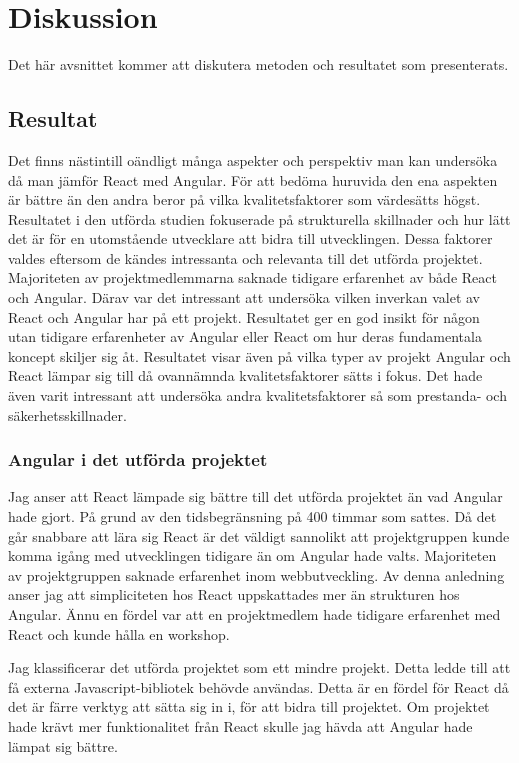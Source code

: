 \section{Diskussion}
\label{sec:axel-discussion}
Det här avsnittet kommer att diskutera metoden och resultatet som presenterats. 

\subsection{Resultat}
\label{subsec:axel-discussion-results}
Det finns nästintill oändligt många aspekter och perspektiv man kan undersöka då man jämför React med Angular. För att bedöma huruvida den ena aspekten är bättre än den andra beror på vilka kvalitetsfaktorer som värdesätts högst. Resultatet i den utförda studien fokuserade på strukturella skillnader och hur lätt det är för en utomstående utvecklare att bidra till utvecklingen. Dessa faktorer valdes eftersom de kändes intressanta och relevanta till det utförda projektet. Majoriteten av projektmedlemmarna saknade tidigare erfarenhet av både React och Angular. Därav var det intressant att undersöka vilken inverkan valet av React och Angular har på ett projekt. Resultatet ger en god insikt för någon utan tidigare erfarenheter av Angular eller React om hur deras fundamentala koncept skiljer sig åt. Resultatet visar även på vilka typer av projekt Angular och React lämpar sig till då ovannämnda kvalitetsfaktorer sätts i fokus. Det hade även varit intressant att undersöka andra kvalitetsfaktorer så som prestanda- och säkerhetsskillnader.

\subsubsection{Angular i det utförda projektet}
Jag anser att React lämpade sig bättre till det utförda projektet än vad Angular hade gjort. På grund av den tidsbegränsning på 400 timmar som sattes. Då det går snabbare att lära sig React är det väldigt sannolikt att projektgruppen kunde komma igång med utvecklingen tidigare än om Angular hade valts. Majoriteten av projektgruppen saknade erfarenhet inom webbutveckling. Av denna anledning anser jag att simpliciteten hos React uppskattades mer än strukturen hos Angular. Ännu en fördel var att en projektmedlem hade tidigare erfarenhet med React och kunde hålla en workshop. 

Jag klassificerar det utförda projektet som ett mindre projekt. Detta ledde till att få externa Javascript-bibliotek behövde användas. Detta är en fördel för React då det är färre verktyg att sätta sig in i, för att bidra till projektet. Om projektet hade krävt mer funktionalitet från React skulle jag hävda att Angular hade lämpat sig bättre.

